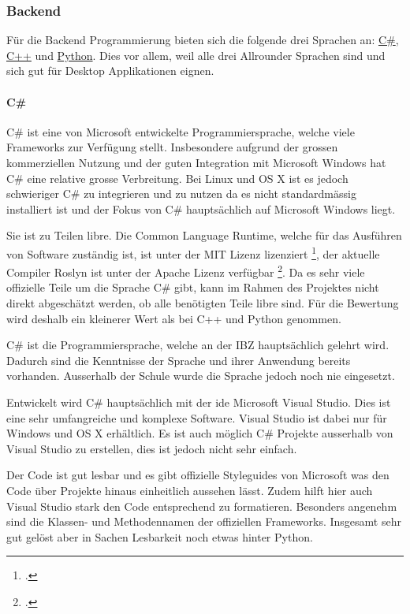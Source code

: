 \subsubsection{Backend}
\label{sec:org7487082}

Für die Backend Programmierung bieten sich die folgende drei Sprachen an: \hyperref[sec:org88a8f6c]{C\#},
\hyperref[sec:orga42458f]{C++} und \hyperref[sec:org5438e66]{Python}. Dies vor allem, weil alle drei Allrounder Sprachen sind und sich
gut für Desktop Applikationen eignen.

\paragraph{C\#}
\label{sec:org88a8f6c}

C\# ist eine von Microsoft entwickelte Programmiersprache, welche viele
Frameworks zur Verfügung stellt. Insbesondere aufgrund der grossen
kommerziellen Nutzung und der guten Integration mit Microsoft Windows hat C\#
eine relative grosse Verbreitung. Bei Linux und OS X ist es jedoch schwieriger
C\# zu integrieren und zu nutzen da es nicht standardmässig installiert ist und
der Fokus von C\# hauptsächlich auf Microsoft Windows liegt.

Sie ist zu Teilen \gls{libre}. Die Common Language Runtime, welche für das
Ausführen von Software zuständig ist, ist unter der MIT Lizenz lizenziert
\footcite{csharp}, der aktuelle Compiler Roslyn ist unter der Apache Lizenz
verfügbar \footcite{roslyn}. Da es sehr viele offizielle Teile um die Sprache C\#
gibt, kann im Rahmen des Projektes nicht direkt abgeschätzt werden, ob alle
benötigten Teile \gls{libre} sind. Für die Bewertung wird deshalb ein kleinerer
Wert als bei C++ und Python genommen.

C\# ist die Programmiersprache, welche an der IBZ hauptsächlich gelehrt wird.
Dadurch sind die Kenntnisse der Sprache und ihrer Anwendung bereits vorhanden.
Ausserhalb der Schule wurde die Sprache jedoch noch nie eingesetzt.

Entwickelt wird C\# hauptsächlich mit der \gls{ide} Microsoft Visual Studio. Dies
ist eine sehr umfangreiche und komplexe Software. Visual Studio ist dabei nur
für Windows und OS X erhältlich. Es ist auch möglich C\# Projekte ausserhalb von
Visual Studio zu erstellen, dies ist jedoch nicht sehr einfach.

Der Code ist gut lesbar und es gibt offizielle Styleguides von Microsoft was
den Code über Projekte hinaus einheitlich aussehen lässt. Zudem
hilft hier auch Visual Studio stark den Code entsprechend zu formatieren.
Besonders angenehm sind die Klassen- und Methodennamen der offiziellen
Frameworks. Insgesamt sehr gut gelöst aber in Sachen Lesbarkeit noch etwas
hinter Python.

